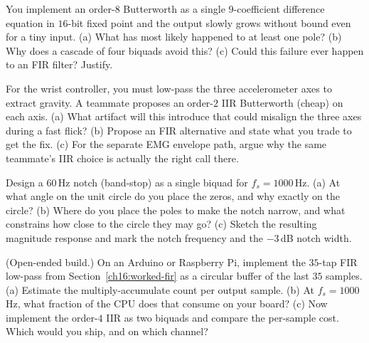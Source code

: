 \begin{exercise}
You implement an order-$8$ Butterworth as a single $9$-coefficient difference
equation in $16$-bit fixed point and the output slowly grows without bound even
for a tiny input. (a) What has most likely happened to at least one pole? (b) Why
does a cascade of four biquads avoid this? (c) Could this failure ever happen to
an FIR filter? Justify.
\end{exercise}

\begin{exercise}
For the wrist controller, you must low-pass the three accelerometer axes to extract
gravity. A teammate proposes an order-$2$ IIR Butterworth (cheap) on each axis.
(a) What artifact will this introduce that could misalign the three axes during a
fast flick? (b) Propose an FIR alternative and state what you trade to get the fix.
(c) For the separate EMG envelope path, argue why the same teammate's IIR choice is
actually the right call there.
\end{exercise}

\begin{exercise}
Design a $60$\,Hz notch (band-stop) as a single biquad for $f_s = 1000$\,Hz.
(a) At what angle on the unit circle do you place the zeros, and why exactly on the
circle? (b) Where do you place the poles to make the notch narrow, and what
constrains how close to the circle they may go? (c) Sketch the resulting magnitude
response and mark the notch frequency and the $-3$\,dB notch width.
\end{exercise}

\begin{exercise}
(Open-ended build.) On an Arduino or Raspberry Pi, implement the $35$-tap FIR
low-pass from Section~\ref{ch16:worked-fir} as a circular buffer of the last $35$
samples. (a) Estimate the multiply-accumulate count per output sample. (b) At
$f_s = 1000$\,Hz, what fraction of the CPU does that consume on your board?
(c) Now implement the order-$4$ IIR as two biquads and compare the per-sample
cost. Which would you ship, and on which channel?
\end{exercise}
